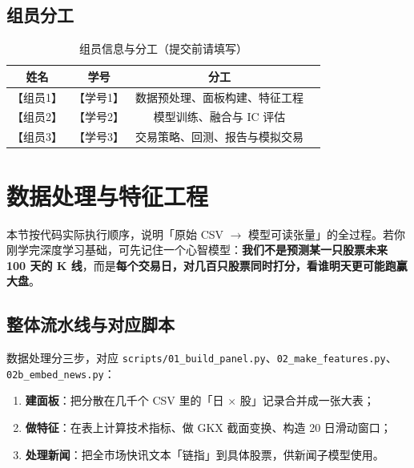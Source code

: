 \documentclass[UTF8,a4paper,12pt]{ctexart}
\begin{document}
\subsection{组员分工}

\begin{table}[H]
\centering
\caption{组员信息与分工（提交前请填写）}
\begin{tabular}{cccc}
\toprule
\textbf{姓名} & \textbf{学号} & \textbf{分工} \\
\midrule
【组员1】 & 【学号1】 & 数据预处理、面板构建、特征工程 \\
【组员2】 & 【学号2】 & 模型训练、融合与 IC 评估 \\
【组员3】 & 【学号3】 & 交易策略、回测、报告与模拟交易 \\
\bottomrule
\end{tabular}
\end{table}

\section{数据处理与特征工程}

本节按代码实际执行顺序，说明「原始 CSV $\to$ 模型可读张量」的全过程。若你刚学完深度学习基础，可先记住一个心智模型：\textbf{我们不是预测某一只股票未来 100 天的 K 线}，而是\textbf{每个交易日，对几百只股票同时打分，看谁明天更可能跑赢大盘}。

\subsection{整体流水线与对应脚本}

数据处理分三步，对应 \texttt{scripts/01\_build\_panel.py}、\texttt{02\_make\_features.py}、\texttt{02b\_embed\_news.py}：

\begin{enumerate}[leftmargin=2em]
  \item \textbf{建面板}：把分散在几千个 CSV 里的「日 $\times$ 股」记录合并成一张大表；
  \item \textbf{做特征}：在表上计算技术指标、做 GKX 截面变换、构造 20 日滑动窗口；
  \item \textbf{处理新闻}：把全市场快讯文本「链指」到具体股票，供新闻子模型使用。
\end{enumerate}
\end{document}
